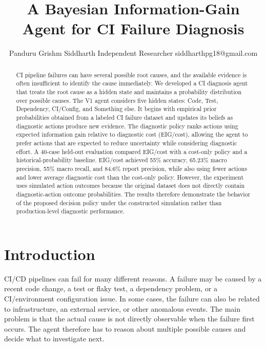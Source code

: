 \documentclass{article}
\title{A Bayesian Information-Gain Agent for CI Failure Diagnosis}
\author{
Panduru Grishm Siddharth
\affiliations
Independent Researcher
\emails
siddharthpg18@gmail.com
}
\begin{document}
\maketitle

\begin{abstract}
CI pipeline failures can have several possible root causes, and the available evidence is often insufficient to identify the cause immediately. We developed a CI diagnosis agent that treats the root cause as a hidden state and maintains a probability distribution over possible causes. The V1 agent considers five hidden states: Code, Test, Dependency, CI/Config, and Something else. It begins with empirical prior probabilities obtained from a labeled CI failure dataset and updates its beliefs as diagnostic actions produce new evidence. The diagnostic policy ranks actions using expected information gain relative to diagnostic cost (EIG/cost), allowing the agent to prefer actions that are expected to reduce uncertainty while considering diagnostic effort. A 40-case held-out evaluation compared EIG/cost with a cost-only policy and a historical-probability baseline. EIG/cost achieved 55\% accuracy, 65.23\% macro precision, 55\% macro recall, and 84.6\% report precision, while also using fewer actions and lower average diagnostic cost than the cost-only policy. However, the experiment uses simulated action outcomes because the original dataset does not directly contain diagnostic-action outcome probabilities. The results therefore demonstrate the behavior of the proposed decision policy under the constructed simulation rather than production-level diagnostic performance.
\end{abstract}

\section{Introduction}

CI/CD pipelines can fail for many different reasons. A failure may be caused by a recent code change, a test or flaky test, a dependency problem, or a CI/environment configuration issue. In some cases, the failure can also be related to infrastructure, an external service, or other anomalous events. The main problem is that the actual cause is not directly observable when the failure first occurs. The agent therefore has to reason about multiple possible causes and decide what to investigate next.
\end{document}
